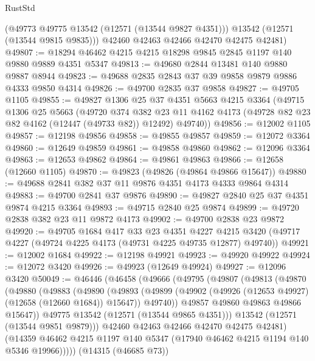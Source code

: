 \begin{lexlean}{RustStd}
\begin{coremodule}
        (@49773 @49775 @13542 (@12571 (@13544 @9827 @4351)))
        @13542
        (@12571 (@13544 @9815 @9835)))
      @42460
      @42463
      @42466
      @42470
      @42475
      @42481)
@49807 := @18294 @46462 @4215 @4215 @18298 @9845 @2845 @1197 @140 @9880 @9889 @4351 @5347
@49813 := @49680 @2844 @13481 @140 @9880 @9887 @8944
@49823 := @49688 @2835 @2843 @37 @39 @9858 @9879 @9886 @4333 @9850 @4314
@49826 := @49700 @2835 @37 @9858
@49827 := @49705 @1105
@49855 := @49827
    @1306
    @25
    @37
    @4351
    @5663
    @4215
    @3364
    (@49715
      @1306
      @25
      @5663
      (@49720
        @374
        @382
        @23
        @11
        @4162
        @4173
        (@49728 @82 @23 @82 @4162 (@12447 (@49733 @82)) @12492)
        @49740))
@49856 := @12002 @1105
@49857 := @12198 @49856
@49858 := @49855 @49857
@49859 := @12072 @3364
@49860 := @12649 @49859
@49861 := @49858 @49860
@49862 := @12096 @3364
@49863 := @12653 @49862
@49864 := @49861 @49863
@49866 := @12658 (@12660 @1105)
@49870 := @49823 (@49826 (@49864 @49866 @15647))
@49880 := @49688 @2841 @382 @37 @11 @9876 @4351 @4173 @4333 @9864 @4314
@49883 := @49700 @2841 @37 @9876
@49890 := @49827 @2840 @25 @37 @4351 @9874 @4215 @3364
@49893 := @49715 @2840 @25 @9874
@49899 := @49720 @2838 @382 @23 @11 @9872 @4173
@49902 := @49700 @2838 @23 @9872
@49920 := @49705
    @1684
    @417
    @33
    @23
    @4351
    @4227
    @4215
    @3420
    (@49717 @4227 (@49724 @4225 @4173 (@49731 @4225 @49735 @12877) @49740))
@49921 := @12002 @1684
@49922 := @12198 @49921
@49923 := @49920 @49922
@49924 := @12072 @3420
@49926 := @49923 (@12649 @49924)
@49927 := @12096 @3420
@50049 := @46446
    (@46458
      (@49666
        (@49795
          (@49807
            (@49813
              (@49870
                (@49880
                  (@49883
                    (@49890
                      (@49893
                        (@49899
                          (@49902 (@49926 (@12653 @49927) (@12658 (@12660 @1684)) @15647))
                          @49740))
                      @49857
                      @49860
                      @49863
                      @49866
                      @15647))
                  @49775
                  @13542
                  (@12571 (@13544 @9865 @4351)))
                @13542
                (@12571 (@13544 @9851 @9879)))
              @42460
              @42463
              @42466
              @42470
              @42475
              @42481)
            (@14359 @46462 @4215 @1197 @140 @5347 (@17940 @46462 @4215 @1194 @140 @5346 @19966)))))
      (@14315 (@46685 @73))

\end{coremodule}
\end{lexlean}
